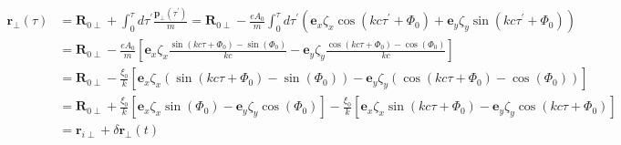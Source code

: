 \begin{align}
  \mathbf{r}_{\perp}(\tau) & =\mathbf{R}_{0 \perp}+\int_{0}^{\tau} d \tau^{\prime} \frac{\mathbf{p}_{\perp}\left(\tau^{\prime}\right)}{m}=\mathbf{R}_{0 \perp}-\frac{e A_{0}}{m} \int_{0}^{\tau} d \tau^{\prime}\left(\mathbf{e}_{x} \zeta_{x} \cos \left(k c \tau^{\prime}+\Phi_{0}\right)+\mathbf{e}_{y} \zeta_{y} \sin \left(k c \tau^{\prime}+\Phi_{0}\right)\right)  \label{II.2.4.21} \\
                           & =\mathbf{R}_{0 \perp}-\frac{e A_{0}}{m}\left[\mathbf{e}_{x} \zeta_{x} \frac{\sin \left(k c \tau+\Phi_{0}\right)-\sin \left(\Phi_{0}\right)}{k c}-\mathbf{e}_{y} \zeta_{y} \frac{\cos \left(k c \tau+\Phi_{0}\right)-\cos \left(\Phi_{0}\right)}{k c}\right]                                                                                                    \\
                           & =\mathbf{R}_{0 \perp}-\frac{\xi_{0}}{k}\left[\mathbf{e}_{x} \zeta_{x}\left(\sin \left(k c \tau+\Phi_{0}\right)-\sin \left(\Phi_{0}\right)\right)-\mathbf{e}_{y} \zeta_{y}\left(\cos \left(k c \tau+\Phi_{0}\right)-\cos \left(\Phi_{0}\right)\right)\right]                                                                                                    \\
                           & =\mathbf{R}_{0 \perp}+\frac{\xi_{0}}{k}\left[\mathbf{e}_{x} \zeta_{x} \sin \left(\Phi_{0}\right)-\mathbf{e}_{y} \zeta_{y} \cos \left(\Phi_{0}\right)\right]-\frac{\xi_{0}}{k}\left[\mathbf{e}_{x} \zeta_{x} \sin \left(k c \tau+\Phi_{0}\right)-\mathbf{e}_{y} \zeta_{y} \cos \left(k c \tau+\Phi_{0}\right)\right]  \label{II.2.4.22}                         \\
                           & =\mathbf{r}_{i \perp}+\delta \mathbf{r}_{\perp}(t) \label{II.2.4.23}                                                                                                                                                                                                                                                                                           \\
\end{align}

